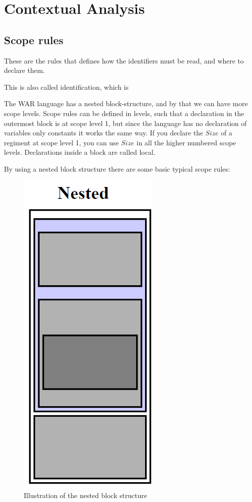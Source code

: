\section{Contextual Analysis}

	\subsection{Scope rules}
	These are the rules that defines how the identifiers must be read, and where to declare them.
	
	This is also called identification, which is 
	
	
	
	
	
	
	
	The WAR language has a nested block-structure, and by that we can have more scope levels. 
	Scope rules can be defined in levels, such that a declaration in the outermost block is at scope level 1, but since the language has no declaration of variables only constants it works the same way. If you declare the $Size$ of a regiment at scope level 1, you can use $Size$ in all the higher numbered scope levels. Declarations inside a block are called local.
		\newpage

	By using a nested block structure there are some basic typical scope rules:
	\begin{figure}
		\begin{center}
			\includegraphics[scale=1]{rapport/2/figures/nested_block_structure}
		\end{center}	
		\caption{Illustration of the nested block structure}
		\label{nested_block_structure}
	\end{figure}


